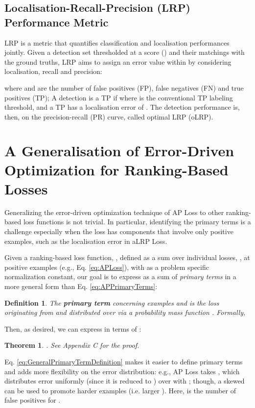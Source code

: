 \documentclass{article}
\newtheorem{theorem}{Theorem}
\newtheorem{definition}{Definition}
\begin{document}
\subsection{Localisation-Recall-Precision (LRP) Performance Metric}
\label{subsec:LRP}
LRP \cite{LRP,LRParXiv} is a metric that  quantifies  classification and localisation performances jointly. Given a detection set thresholded at a score () and their matchings with the ground truths,  LRP  aims to assign an error value within  by considering localisation, recall and precision:

where  and  are the number of false positives (FP), false negatives (FN) and true positives (TP);  A detection is a TP if  where  is the conventional TP labeling threshold, and a TP has a localisation error of . The detection performance is, then,   on the precision-recall (PR) curve, called optimal LRP (oLRP).

%
 \section{A Generalisation of Error-Driven Optimization for Ranking-Based Losses}
\label{sec:generalization}

Generalizing the error-driven optimization technique of AP Loss \cite{APLoss} to other ranking-based loss functions is not trivial. In particular, identifying the primary terms is a challenge especially when the loss has components that involve only  positive examples, such as the localisation error in aLRP Loss. 

Given a ranking-based loss function, , defined as a sum over individual losses, , at positive examples (e.g., Eq. \eqref{eq:APLoss}), with  as a problem specific normalization constant, our goal is to express  as a sum of \textit{primary terms} in a more general form than Eq. \eqref{eq:APPrimaryTerms}: 

\begin{definition} The \textbf{primary term}  concerning examples  and   is the loss originating from  and distributed over  via a probability mass function . Formally, 

\end{definition}
Then, as desired, we can express  in terms of :
\begin{theorem}
\label{theorem:PrimaryTerms}
. See Appendix C for the proof.
\end{theorem}{}
Eq. \eqref{eq:GeneralPrimaryTermDefinition} makes it easier to define primary terms and adds more flexibility on the error distribution: e.g., AP Loss takes , which distributes error uniformly (since it is reduced to ) over  with ; though, a skewed   can be used to promote harder examples (i.e. larger ). Here,  is the number of false positives for .
\end{document}

